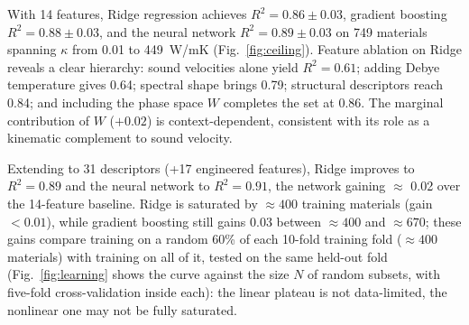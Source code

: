 \documentclass[aps,prm,reprint,onecolumn,groupedaddress]{revtex4-2}
\begin{document}
With 14 features, Ridge regression achieves $R^2 = 0.86 \pm 0.03$, gradient boosting $R^2 = 0.88 \pm 0.03$, and the neural network $R^2 = 0.89 \pm 0.03$ on 749 materials spanning $\kappa$ from 0.01 to 449~W/mK (Fig.~\ref{fig:ceiling}). Feature ablation on Ridge reveals a clear hierarchy: sound velocities alone yield $R^2 = 0.61$; adding Debye temperature gives 0.64; spectral shape brings 0.79; structural descriptors reach 0.84; and including the phase space $W$ completes the set at 0.86. The marginal contribution of $W$ ($+0.02$) is context-dependent, consistent with its role as a kinematic complement to sound velocity.

Extending to 31 descriptors (+17 engineered features), Ridge improves to $R^2 = 0.89$ and the neural network to $R^2 = 0.91$, the network gaining $\approx$ 0.02 over the 14-feature baseline. Ridge is saturated by $\approx 400$ training materials (gain $< 0.01$), while gradient boosting still gains 0.03 between $\approx 400$ and $\approx 670$; these gains compare training on a random 60\% of each 10-fold training fold ($\approx 400$ materials) with training on all of it, tested on the same held-out fold (Fig.~\ref{fig:learning} shows the curve against the size $N$ of random subsets, with five-fold cross-validation inside each): the linear plateau is not data-limited, the nonlinear one may not be fully saturated.
\end{document}
